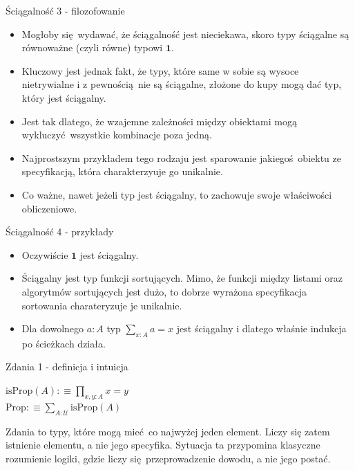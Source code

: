 \documentclass{beamer}
\newcommand{\defn}{:\equiv}
\newcommand{\U}{\mathcal{U}}
\newcommand{\isProp}{\text{isProp}}
\newcommand{\Prop}{\text{Prop}}
\begin{document}
\begin{frame}{Ściągalność 3 - filozofowanie}
\begin{itemize}
	\item Mogłoby się wydawać, że ściągalność jest nieciekawa, skoro typy ściągalne są równoważne (czyli równe) typowi $\mathbf{1}$.
	\item Kluczowy jest jednak fakt, że typy, które same w sobie są wysoce nietrywialne i z pewnością nie są ściągalne, złożone do kupy mogą dać typ, który jest ściągalny.
	\item Jest tak dlatego, że wzajemne zależności między obiektami mogą wykluczyć wszystkie kombinacje poza jedną.
	\item Najprostszym przykładem tego rodzaju jest sparowanie jakiegoś obiektu ze specyfikacją, która charakterzyuje go unikalnie.
	\item Co ważne, nawet jeżeli typ jest ściągalny, to zachowuje swoje właściwości obliczeniowe.
\end{itemize}
\end{frame}

\begin{frame}{Ściągalność 4 - przykłady}
\begin{itemize}
	\item Oczywiście $\mathbf{1}$ jest ściągalny.
	\item Ściągalny jest typ funkcji sortujących. Mimo, że funkcji między listami oraz algorytmów sortujących jest dużo, to dobrze wyrażona specyfikacja sortowania charateryzuje je unikalnie.
	\item Dla dowolnego $a : A$ typ $\sum_{x : A} a = x$ jest ściągalny i dlatego właśnie indukcja po ścieżkach działa.
\end{itemize}
\end{frame}

\begin{frame}{Zdania 1 - definicja i intuicja}

\begin{definition}[Zdanie]
$\isProp(A) \defn \prod_{x, y : A} x = y$ \\
$\Prop \defn \sum_{A : \U} \isProp(A)$
\end{definition}

Zdania to typy, które mogą mieć co najwyżej jeden element. Liczy się zatem istnienie elementu, a nie jego specyfika. Sytuacja ta przypomina klasyczne rozumienie logiki, gdzie liczy się przeprowadzenie dowodu, a nie jego postać.

\end{frame}
\end{document}
